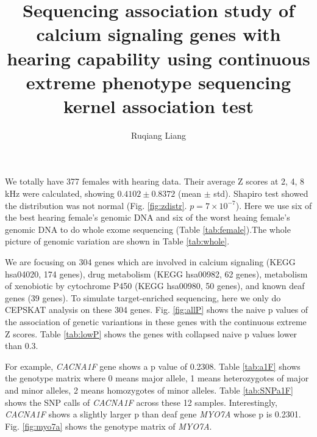 \documentclass{article}
\begin{document}


\title{Sequencing association study of calcium signaling genes with hearing capability using continuous extreme phenotype sequencing kernel association test}
\author{Ruqiang Liang}
\maketitle

We totally have 377 females with hearing data. Their average Z scores at 2, 4, 8 kHz were calculated, showing $0.4102 \pm 0.8372$ (mean $\pm$ std). Shapiro test showed the distribution was not normal (Fig. \ref{fig:zdistr}. $p = 7 \times 10^{-7}$). Here we use six of the best hearing female's genomic DNA and six of the worst heaing female's genomic DNA to do whole exome sequencing (Table \ref{tab:female}).The whole picture of genomic variation are shown in Table \ref{tab:whole}.

We are focusing on 304 genes which are involved in calcium signaling (KEGG hsa04020, 174 genes), drug metabolism (KEGG hsa00982, 62 genes), metabolism of xenobiotic by cytochrome P450 (KEGG hsa00980, 50 genes), and known deaf genes (39 genes). To simulate target-enriched sequencing, here we only do CEPSKAT analysis on these 304 genes. Fig. \ref{fig:allP} shows the naive p values of the association of genetic variantions in these genes with the continuous extreme Z scores. Table \ref{tab:lowP} shows the genes with collapsed naive p values lower than 0.3. 

For example, {\it CACNA1F} gene shows a p value of 0.2308. Table \ref{tab:a1F} shows the genotype matrix where 0 means major allele, 1 means heterozygotes of major and minor alleles, 2 means homozygotes of minor alleles. Table \ref{tab:SNPa1F} shows the SNP calls of {\it CACNA1F} across these 12 samples. Interestingly, {\it CACNA1F} shows  a slightly larger p than deaf gene {\it MYO7A} whose p is 0.2301. Fig. \ref{fig:myo7a} shows the genotype matrix of {\it MYO7A}. 
\end{document}
